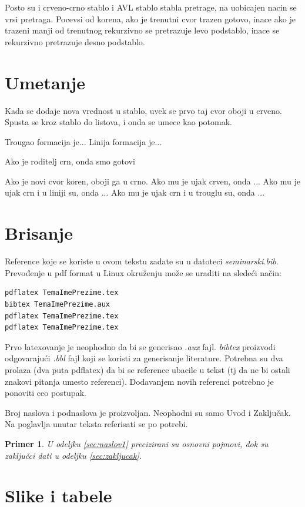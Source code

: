 \documentclass[a4paper]{article}
\newtheorem{primer}{Primer}[section]
\begin{document}
    Posto su i crveno-crno stablo i AVL stablo stabla pretrage, na uobicajen nacin se vrsi pretraga. Pocevsi od korena, ako je trenutni cvor trazen gotovo, inace ako
    je trazeni manji od trenutnog rekurzivno se pretrazuje levo podstablo, inace se rekurzivno pretrazuje desno podstablo.
\section{Umetanje}
    Kada se dodaje nova vrednost u stablo, uvek se prvo taj cvor oboji u crveno.
    Spusta se kroz stablo do listova, i onda se umece kao potomak.

    Trougao formacija je...
    Linija formacija je...

    Ako je roditelj crn, onda smo gotovi

    Ako je novi cvor koren, oboji ga u crno.
    Ako mu je ujak crven, onda ...
    Ako mu je ujak crn i u liniji su, onda ...
    Ako mu je ujak crn i u trouglu su, onda ...



\section{Brisanje}

Reference koje se koriste u ovom tekstu zadate su u datoteci {\em seminarski.bib}. Prevođenje u pdf format u Linux okruženju može se uraditi na sledeći način:
\begin{verbatim}
pdflatex TemaImePrezime.tex 
bibtex TemaImePrezime.aux 
pdflatex TemaImePrezime.tex 
pdflatex TemaImePrezime.tex 
\end{verbatim}
Prvo latexovanje je neophodno da bi se generisao {\em .aux} fajl. {\em bibtex} proizvodi odgovarajući {\em .bbl} fajl koji se koristi za generisanje literature. 
Potrebna su dva prolaza (dva puta pdflatex) da bi se reference ubacile u tekst (tj da ne bi ostali znakovi pitanja umesto referenci). Dodavanjem novih referenci potrebno je ponoviti ceo postupak.  


Broj naslova i podnaslova je proizvoljan. Neophodni su samo Uvod i Zaključak. Na poglavlja unutar teksta referisati se po potrebi. 
\begin{primer}
U odeljku \ref{sec:naslov1} precizirani su osnovni pojmovi, dok su zaključci dati u odeljku \ref{sec:zakljucak}.
\end{primer}




\section{Slike i tabele}
\label{slike_i_tabele}
\end{document}
